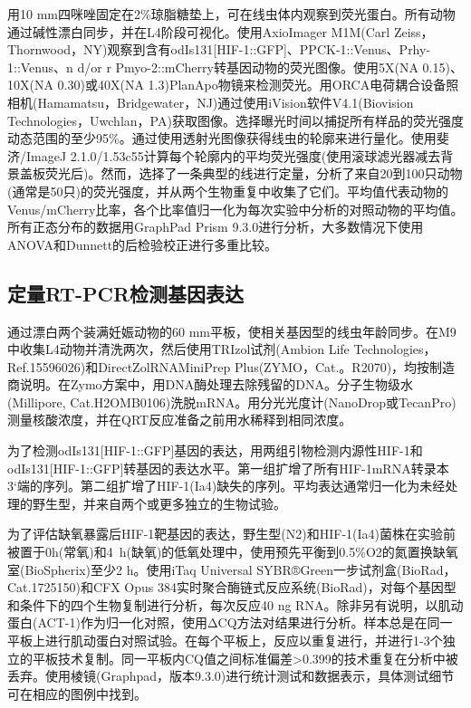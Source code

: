 \documentclass{ctexart}
\begin{document}
        用10 mm四咪唑固定在2\%琼脂糖垫上，可在线虫体内观察到荧光蛋白。所有动物通过碱性漂白同步，并在L4阶段可视化。使用AxioImager M1M(Carl Zeiss，Thornwood，NY)观察到含有odIs131[HIF-1::GFP]、PPCK-1::Venus、Prhy-1::Venus、n d/or r Pmyo-2::mCherry转基因动物的荧光图像。使用5X(NA 0.15)、10X(NA 0.30)或40X(NA 1.3)PlanApo物镜来检测荧光。用ORCA电荷耦合设备照相机(Hamamatsu，Bridgewater，NJ)通过使用iVision软件V4.1(Biovision Technologies，Uwchlan，PA)获取图像。选择曝光时间以捕捉所有样品的荧光强度动态范围的至少95\%。通过使用透射光图像获得线虫的轮廓来进行量化。使用斐济/ImageJ 2.1.0/1.53c55计算每个轮廓内的平均荧光强度(使用滚球滤光器减去背景盖板荧光后)。然而，选择了一条典型的线进行定量，分析了来自20到100只动物(通常是50只)的荧光强度，并从两个生物重复中收集了它们。平均值代表动物的Venus/mCherry比率，各个比率值归一化为每次实验中分析的对照动物的平均值。所有正态分布的数据用GraphPad Prism 9.3.0进行分析，大多数情况下使用ANOVA和Dunnett的后检验校正进行多重比较。

    \subsection{定量RT-PCR检测基因表达}

        通过漂白两个装满妊娠动物的60 mm平板，使相关基因型的线虫年龄同步。在M9中收集L4动物并清洗两次，然后使用TRIzol试剂(Ambion Life Technologies，Ref.15596026)和DirectZolRNAMiniPrep Plus(ZYMO，Cat.。R2070)，均按制造商说明。在Zymo方案中，用DNA酶处理去除残留的DNA。分子生物级水(Millipore, Cat.H2OMB0106)洗脱mRNA。用分光光度计(NanoDrop或TecanPro)测量核酸浓度，并在QRT反应准备之前用水稀释到相同浓度。

        为了检测odIs131[HIF-1::GFP]基因的表达，用两组引物检测内源性HIF-1和odIs131[HIF-1::GFP]转基因的表达水平。第一组扩增了所有HIF-1mRNA转录本3‘端的序列。第二组扩增了HIF-1(Ia4)缺失的序列。平均表达通常归一化为未经处理的野生型，并来自两个或更多独立的生物试验。
        
        为了评估缺氧暴露后HIF-1靶基因的表达，野生型(N2)和HIF-1(Ia4)菌株在实验前被置于0h(常氧)和4~h(缺氧)的低氧处理中，使用预先平衡到0.5\%O2的氮置换缺氧室(BioSpherix)至少2 h。使用iTaq Universal SYBR®Green一步试剂盒(BioRad，Cat.1725150)和CFX Opus 384实时聚合酶链式反应系统(BioRad)，对每个基因型和条件下的四个生物复制进行分析，每次反应40 ng RNA。除非另有说明，以肌动蛋白(ACT-1)作为归一化对照，使用ΔCQ方法对结果进行分析。样本总是在同一平板上进行肌动蛋白对照试验。在每个平板上，反应以重复进行，并进行1-3个独立的平板技术复制。同一平板内CQ值之间标准偏差>0.399的技术重复在分析中被丢弃。使用棱镜(Graphpad，版本9.3.0)进行统计测试和数据表示，具体测试细节可在相应的图例中找到。
\end{document}
